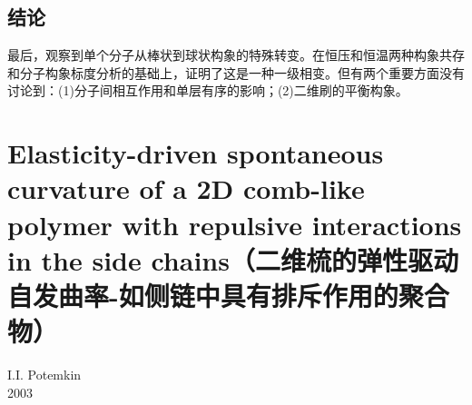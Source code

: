 \documentclass[12pt,a4paper]{article}
\numberwithin{equation}{section}
\begin{document}
\subsection{结论}
最后，观察到单个分子从棒状到球状构象的特殊转变。在恒压和恒温两种构象共存和分子构象标度分析的基础上，证明了这是一种一级相变。但有两个重要方面没有讨论到：(1)分子间相互作用和单层有序的影响；(2)二维刷的平衡构象。

	
\section{Elasticity-driven spontaneous curvature of a 2D comb-like polymer with repulsive interactions in the side chains（二维梳的弹性驱动自发曲率-如侧链中具有排斥作用的聚合物）}
\begin{center}
I.I. Potemkin\\
2003
\end{center}
\end{document}
